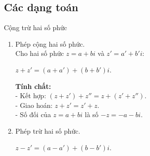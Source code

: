 \subsection{Các dạng toán}
\begin{dang}{Cộng trừ hai số phức}


\begin{enumerate}
\item Phép cộng hai số phức.\\

Cho hai số phức $z=a+bi$ và $z'=a'+b'i$:
\begin{center}
$z+z'=(a+a')+(b+b')i$.
\end{center}
\textbf{Tính chất:}\\
- Kết hợp: $(z+z')+z''=z+(z'+z'')$.\\
- Giao hoán: $z+z'=z'+z$.\\
- Số đối của $z=a+bi$ là số $-z=-a-bi$.

\item Phép trừ hai số phức.
\begin{center}
$z-z'=(a-a')+(b-b')i$.
\end{center}

\end{enumerate}
\end{dang}

